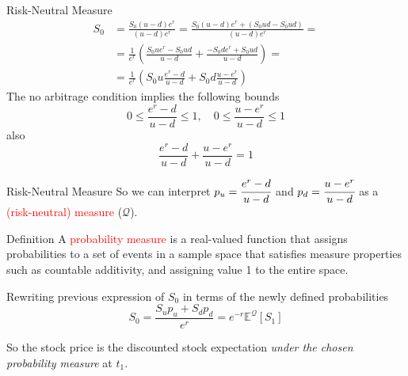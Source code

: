 \documentclass{beamer}
\begin{document}
\begin{frame}{Risk-Neutral Measure}
	\begin{equation*}
		\begin{aligned}
			S_0 &= \frac{S_0(u-d)e^r}{(u-d)e^r} = \frac{S_0(u-d)e^r + (S_0ud - S_0ud)}{(u-d)e^r}=\\
			&= \frac{1}{e^r}\left(\frac{S_0ue^r - S_0ud}{u-d} + \frac{-S_0de^r + S_0ud}{u-d}\right)=\\
			&= \frac{1}{e^r}\left(S_0u\frac{e^r - d}{u-d} + S_0d\frac{u - e^r}{u-d}\right)
		\end{aligned}
	\end{equation*}
	\pause
	The no arbitrage condition implies the following bounds
	\begin{equation*}
		\boxed{0\le\frac{e^r -d}{u-d}\le 1,\quad 0\le\frac{u - e^r}{u-d}\le 1}
	\end{equation*}
	\pause
	also
	\begin{equation}
		\boxed{\frac{e^r -d}{u-d} + \frac{u - e^r}{u-d} = 1}
	\label{eq:risk_neutral_probabilities}
	\end{equation}
\end{frame}

\begin{frame}{Risk-Neutral Measure}
	So we can interpret $p_u=\cfrac{e^r -d}{u-d}$ and $p_d=\cfrac{u - e^r}{u-d}$ as a \textcolor{red}{(risk-neutral) measure} ($\mathcal{Q}$).\vspace{0.3cm}
	
	\pause
	\begin{block}{Definition}
		A \textcolor{red}{probability measure} is a real-valued function that assigns probabilities to a set of events in a sample space that satisfies measure properties such as countable additivity, and assigning value 1 to the entire space.
	\end{block}	
	\pause
	Rewriting previous expression of $S_0$ in terms of the newly defined probabilities
	\begin{equation}
		S_0 = \frac{S_up_u + S_dp_d}{e^r} = e^{-r}\mathbb{E}^\mathcal{Q}[S_1]
		\label{eq:risk_neutral_price}
	\end{equation}
	
	So the stock price is the discounted stock expectation \emph{under the chosen probability measure} at $t_1$.
\end{frame}
\end{document}
